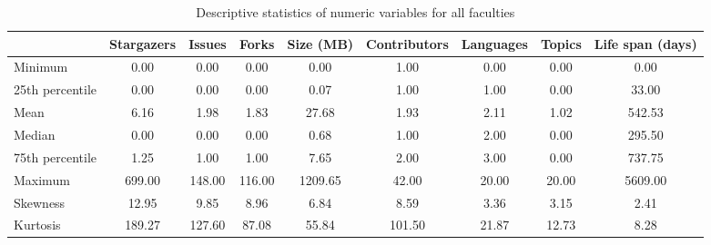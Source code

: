 \begin{table}
\centering
\caption{Descriptive statistics of numeric variables for all faculties}
\label{tab:all_faculties}
\begin{tabular}{lcccccccc}
\toprule
{} &  Stargazers &  Issues &   Forks &  Size (MB) &  Contributors &  Languages &  Topics &  Life span (days) \\
\midrule
Minimum         &        0.00 &    0.00 &    0.00 &       0.00 &          1.00 &       0.00 &    0.00 &              0.00 \\
25th percentile &        0.00 &    0.00 &    0.00 &       0.07 &          1.00 &       1.00 &    0.00 &             33.00 \\
Mean            &        6.16 &    1.98 &    1.83 &      27.68 &          1.93 &       2.11 &    1.02 &            542.53 \\
Median          &        0.00 &    0.00 &    0.00 &       0.68 &          1.00 &       2.00 &    0.00 &            295.50 \\
75th percentile &        1.25 &    1.00 &    1.00 &       7.65 &          2.00 &       3.00 &    0.00 &            737.75 \\
Maximum         &      699.00 &  148.00 &  116.00 &    1209.65 &         42.00 &      20.00 &   20.00 &           5609.00 \\
Skewness        &       12.95 &    9.85 &    8.96 &       6.84 &          8.59 &       3.36 &    3.15 &              2.41 \\
Kurtosis        &      189.27 &  127.60 &   87.08 &      55.84 &        101.50 &      21.87 &   12.73 &              8.28 \\
\bottomrule
\end{tabular}
\end{table}
